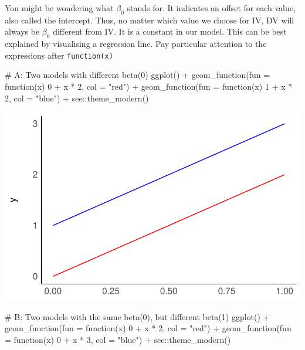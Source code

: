 \documentclass[
  letterpaper,
]{krantz}
\makeatletter
\newenvironment{Shaded}{\begin{snugshade}}{\end{snugshade}}
\newcommand{\AttributeTok}[1]{\textcolor[rgb]{0.40,0.45,0.13}{#1}}
\newcommand{\CommentTok}[1]{\textcolor[rgb]{0.37,0.37,0.37}{#1}}
\newcommand{\ControlFlowTok}[1]{\textcolor[rgb]{0.00,0.23,0.31}{#1}}
\newcommand{\DecValTok}[1]{\textcolor[rgb]{0.68,0.00,0.00}{#1}}
\newcommand{\FunctionTok}[1]{\textcolor[rgb]{0.28,0.35,0.67}{#1}}
\newcommand{\NormalTok}[1]{\textcolor[rgb]{0.00,0.23,0.31}{#1}}
\newcommand{\SpecialCharTok}[1]{\textcolor[rgb]{0.37,0.37,0.37}{#1}}
\newcommand{\StringTok}[1]{\textcolor[rgb]{0.13,0.47,0.30}{#1}}
\newenvironment{kframe}{%
\medskip{}
\setlength{\fboxsep}{.8em}
 \def\at@end@of@kframe{}%
 \ifinner\ifhmode%
  \def\at@end@of@kframe{\end{minipage}}%
  \begin{minipage}{\columnwidth}%
 \fi\fi%
 \def\FrameCommand##1{\hskip\@totalleftmargin \hskip-\fboxsep
 \colorbox{shadecolor}{##1}\hskip-\fboxsep
     \hskip-\linewidth \hskip-\@totalleftmargin \hskip\columnwidth}%
 \MakeFramed {\advance\hsize-\width
   \@totalleftmargin\z@ \linewidth\hsize
   \@setminipage}}%
 {\par\unskip\endMakeFramed%
 \at@end@of@kframe}
\renewenvironment{Shaded}{\begin{kframe}}{\end{kframe}}
\makeatother
\begin{document}
You might be wondering what \(\beta_0\) stands for. It indicates an
offset for each value, also called the intercept. Thus, no matter which
value we choose for IV, DV will always be \(\beta_0\) different from IV.
It is a constant in our model. This can be best explained by visualising
a regression line. Pay particular attention to the expressions after
\texttt{function(x)}

\begin{Shaded}
\begin{Highlighting}[]
\CommentTok{\# A: Two models with different beta(0)}
\FunctionTok{ggplot}\NormalTok{() }\SpecialCharTok{+}
  \FunctionTok{geom\_function}\NormalTok{(}\AttributeTok{fun =} \ControlFlowTok{function}\NormalTok{(x) }\DecValTok{0} \SpecialCharTok{+}\NormalTok{ x }\SpecialCharTok{*} \DecValTok{2}\NormalTok{, }\AttributeTok{col =} \StringTok{"red"}\NormalTok{) }\SpecialCharTok{+}
  \FunctionTok{geom\_function}\NormalTok{(}\AttributeTok{fun =} \ControlFlowTok{function}\NormalTok{(x) }\DecValTok{1} \SpecialCharTok{+}\NormalTok{ x }\SpecialCharTok{*} \DecValTok{2}\NormalTok{, }\AttributeTok{col =} \StringTok{"blue"}\NormalTok{) }\SpecialCharTok{+}
\NormalTok{  see}\SpecialCharTok{::}\FunctionTok{theme\_modern}\NormalTok{()  }
\end{Highlighting}
\end{Shaded}

\includegraphics{13_regressions_files/figure-pdf/beta-zero-beta-one-explained-1.pdf}

\begin{Shaded}
\begin{Highlighting}[]
\CommentTok{\# B: Two models with the same beta(0), but different beta(1)}
\FunctionTok{ggplot}\NormalTok{() }\SpecialCharTok{+}
  \FunctionTok{geom\_function}\NormalTok{(}\AttributeTok{fun =} \ControlFlowTok{function}\NormalTok{(x) }\DecValTok{0} \SpecialCharTok{+}\NormalTok{ x }\SpecialCharTok{*} \DecValTok{2}\NormalTok{, }\AttributeTok{col =} \StringTok{"red"}\NormalTok{) }\SpecialCharTok{+}
  \FunctionTok{geom\_function}\NormalTok{(}\AttributeTok{fun =} \ControlFlowTok{function}\NormalTok{(x) }\DecValTok{0} \SpecialCharTok{+}\NormalTok{ x }\SpecialCharTok{*} \DecValTok{3}\NormalTok{, }\AttributeTok{col =} \StringTok{"blue"}\NormalTok{) }\SpecialCharTok{+}
\NormalTok{  see}\SpecialCharTok{::}\FunctionTok{theme\_modern}\NormalTok{()}
\end{Highlighting}
\end{Shaded}
\end{document}
